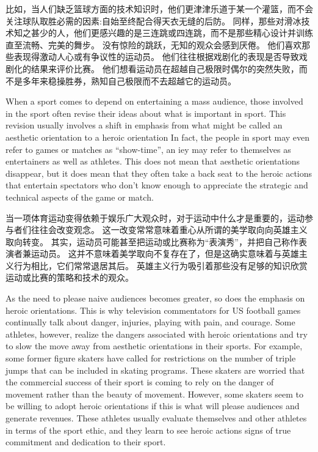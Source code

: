 \documentclass[cs4size, a4paper, 12pt]{article}
\newcounter{numpar}
\newcommand*{\newpar}{\numpar{}}
\begin{document}
	比如，当人们缺乏篮球方面的技术知识时，他们更津津乐道于某一个灌篮，而不会关注球队取胜必需的因素:自始至终配合得天衣无缝的后防。 同样，那些对滑冰技术知之甚少的人，他们更感兴趣的是三连跳或四连跳，而不是那些精心设计并训练直至流畅、完美的舞步。 没有惊险的跳跃，无知的观众会感到厌倦。 他们喜欢那些表现得激动人心或有争议性的运动员。 他们往往根据戏剧化的表现是否导致戏剧化的结果来评价比赛。 他们想看运动员在超越自己极限时偶尔的突然失败，而不是多年来稳操胜券，熟知自己极限而不去超越它的运动员。 
	
	\newpar When a sport comes to depend on entertaining a mass audience, those involved in the sport often revise their ideas about what is important in sport. This revision usually involves a shift in emphasis from what might be called an aesthetic orientation to a heroic orientation In fact, the people in sport may even refer to games or matches as ``show-time'', an iey may refer to themselves as entertainers as well as athletes. This does not mean that aesthetic orientations disappear, but it does mean that they often take a back seat to the heroic actions that entertain spectators who don't know enough to appreciate the strategic and technical aspects of the game or match.
	
	当一项体育运动变得依赖于娱乐广大观众时，对于运动中什么才是重要的，运动参与者们往往会改变观念。 这一改变常常意味着重心从所谓的美学取向向英雄主义取向转变。 其实，运动员可能甚至把运动或比赛称为``表演秀''，并把自己称作表演者兼运动员。 这并不意味着美学取向不复存在了，但是这确实意味着与英雄主义行为相比，它们常常退居其后。 英雄主义行为吸引着那些没有足够的知识欣赏运动或比赛的策略和技术的观众。 
	
	\newpar As the need to please naive audiences becomes greater, so does the emphasis on heroic orientations. This is why television commentators for US football games continually talk about danger, injuries, playing with pain, and courage. Some athletes, however, realize the dangers associated with heroic orientations and try to slow the move away from aesthetic orientations in their sports. For example, some former figure skaters have called for restrictions on the number of triple jumps that can be included in skating programs. These skaters are worried that the commercial success of their sport is coming to rely on the danger of movement rather than the beauty of movement. However, some skaters seem to be willing to adopt heroic orientations if this is what will please audiences and generate revenues. These athletes usually evaluate themselves and other athletes in terms of the sport ethic, and they learn to see heroic actions signs of true commitment and dedication to their sport.
	
\end{document}
